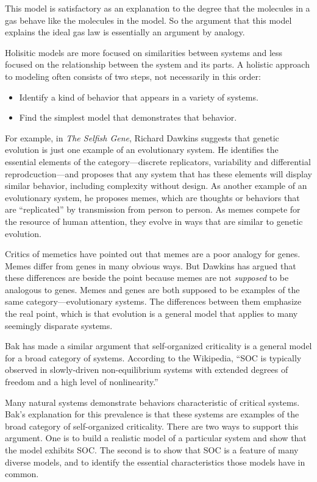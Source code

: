 \documentclass[10pt]{book}
\begin{document}
This model is satisfactory as an explanation to the degree that
the molecules in a gas behave like the molecules in the model.
So the argument that this model explains the ideal gas law
is essentially an argument by analogy.

Holisitic models are more focused on similarities between
systems and less focused on the relationship between the system
and its parts.  A holistic approach to modeling often consists
of two steps, not necessarily in this order:

\begin{itemize}

\item Identify a kind of behavior that appears in a variety of
systems. 

\item Find the simplest model that demonstrates that behavior.

\end{itemize}

For example, in {\em The Selfish Gene}, Richard Dawkins suggests that
genetic evolution is just one example of an evolutionary system.  He
identifies the essential elements of the category---discrete
replicators, variability and differential reprodcuction---and proposes
that any system that has these elements will display similar
behavior, including complexity without design.  As another
example of an evolutionary system, he proposes memes, which are
thoughts or behaviors that are ``replicated'' by transmission
from person to person.  As memes compete for the resource of
human attention, they evolve in ways that are similar to
genetic evolution.

Critics of memetics have pointed out that memes are a poor analogy
for genes.  Memes differ from genes in many obvious ways.  But
Dawkins has argued that these differences are beside the point
because memes are not {\em supposed} to be analogous to genes.
Memes and genes are both supposed to be examples of the same
category---evolutionary systems.  The differences between them
emphasize the real point, which is that evolution is a general model
that applies to many seemingly disparate systems.

Bak has made a similar argument that self-organized criticality is a
general model for a broad category of systems.  According to the
Wikipedia, ``SOC is typically observed in slowly-driven
non-equilibrium systems with extended degrees of freedom and a high
level of nonlinearity.''

Many natural systems demonstrate behaviors characteristic of critical
systems.  Bak's explanation for this prevalence is that these systems
are examples of the broad category of self-organized criticality.
There are two ways to support this argument.  One is to build
a realistic model of a particular system and show that the model
exhibits SOC.  The second is to show that SOC is a feature of many
diverse models, and to identify the essential characteristics
those models have in common.
\end{document}

